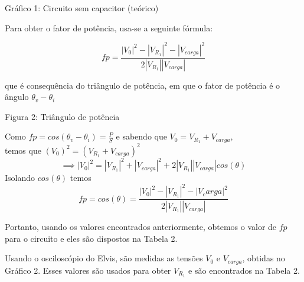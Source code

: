 \documentclass[a4 paper]{article}
\begin{document}
\begin{center}
Gráfico 1: Circuito sem capacitor (teórico)
\end{center}

\newpage


Para obter o fator de potência, usa-se a seguinte fórmula:

\[fp = \frac{|V_0|^2-|V_{R_1}|^2-|V_{carga}|^2}{2|V_{R_1}||V_{carga}|}\]

que é consequência do triângulo de potência, em que o fator de potência é o ângulo $\theta_v-\theta_i$


\vspace{2cm}
\begin{center}
\end{center}

\begin{center}
Figura 2: Triângulo de potência
\end{center}
\vspace{2cm}

Como $fp=cos(\theta_v-\theta_i)=\frac{P}{S}$ e sabendo que $V_0=V_{R_1}+V_{carga}$, \\temos que $(V_0)^2=(V_{R_1}+V_{carga})^2$
\[\implies|V_0|^2=|V_{R_1}|^2 + |V_{carga}|^2+2|V_{R_1}||V_{carga}|cos(\theta)\]
Isolando $cos(\theta)$ temos 
\[fp = cos(\theta)= \frac{|V_0|^2-|V_{R_1}|^2-|V_carga|^2}{2|V_{R_1}||V_{carga}|}\]

Portanto, usando os valores encontrados anteriormente, obtemos o valor de $fp$ para o circuito e eles são dispostos na Tabela 2.

Usando o osciloscópio do Elvis, são medidas as tensões $V_0$ e $V_{carga}$, obtidas no Gráfico 2. Esses valores são usados para obter $V_{R_1}$ e são encontrados na Tabela 2. 

\newpage
\end{document}
